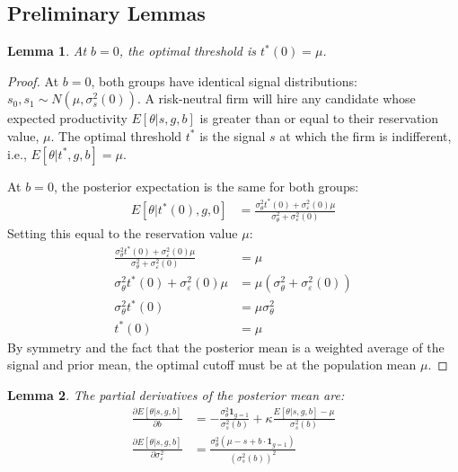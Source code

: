 \documentclass[12pt,a4paper]{article}
\newtheorem{lemma}{Lemma}
\theoremstyle{definition}
\theoremstyle{remark}
\begin{document}
\subsection{Preliminary Lemmas}

\begin{lemma}\label{lemma:threshold_symmetry}
At $b = 0$, the optimal threshold is $t^*(0) = \mu$.
\end{lemma}

\begin{proof}
At $b = 0$, both groups have identical signal distributions: $s_0, s_1 \sim N(\mu, \sigma_s^2(0))$. A risk-neutral firm will hire any candidate whose expected productivity $E[\theta|s,g,b]$ is greater than or equal to their reservation value, $\mu$. The optimal threshold $t^*$ is the signal $s$ at which the firm is indifferent, i.e., $E[\theta|t^*, g, b] = \mu$.

At $b=0$, the posterior expectation is the same for both groups:
\begin{align}
E[\theta | t^*(0), g, 0] &= \frac{\sigma_\theta^2 t^*(0) + \sigma_\varepsilon^2(0) \mu}{\sigma_\theta^2 + \sigma_\varepsilon^2(0)}
\end{align}
Setting this equal to the reservation value $\mu$:
\begin{align}
\frac{\sigma_\theta^2 t^*(0) + \sigma_\varepsilon^2(0) \mu}{\sigma_\theta^2 + \sigma_\varepsilon^2(0)} &= \mu \\
\sigma_\theta^2 t^*(0) + \sigma_\varepsilon^2(0) \mu &= \mu(\sigma_\theta^2 + \sigma_\varepsilon^2(0)) \\
\sigma_\theta^2 t^*(0) &= \mu\sigma_\theta^2 \\
t^*(0) &= \mu
\end{align}
By symmetry and the fact that the posterior mean is a weighted average of the signal and prior mean, the optimal cutoff must be at the population mean $\mu$.
\end{proof}

\begin{lemma}\label{lemma:posterior_derivatives}
The partial derivatives of the posterior mean are:
\begin{align}
\frac{\partial E[\theta | s, g, b]}{\partial b} &= -\frac{\sigma_\theta^2 \mathbf{1}_{g=1}}{\sigma_s^2(b)} + \kappa \frac{E[\theta|s,g,b] - \mu}{\sigma_s^2(b)} \\
\frac{\partial E[\theta | s, g, b]}{\partial \sigma_\varepsilon^2} &= \frac{\sigma_\theta^2(\mu - s + b \cdot \mathbf{1}_{g=1})}{(\sigma_s^2(b))^2}
\end{align}
\end{lemma}
\end{document}
